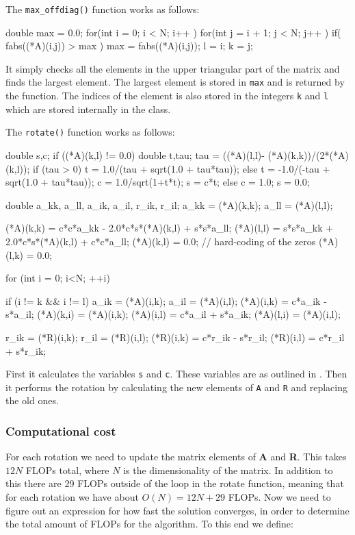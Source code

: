 \documentclass[reprint,english,notitlepage]{revtex4-1}  %
\begin{document}
The \verb+max_offdiag()+ function works as follows:

\begin{cpp}
double max = 0.0;
for(int i = 0; i < N; i++ ){
  for(int j = i + 1; j < N; j++ ){
    if( fabs((*A)(i,j)) > max ){
      max = fabs((*A)(i,j));
      l = i;
      k = j;
    }
  }
}
\end{cpp}

It simply checks all the elements in the upper triangular part of the matrix and finds the largest element. The largest element is stored in \verb+max+ and is returned by the function. The indices of the element is also stored in the integers \verb+k+ and \verb+l+ which are stored internally in the class.

The \verb+rotate()+ function works as follows:

\begin{cpp}
double s,c;
if ((*A)(k,l) != 0.0){
  double t,tau;
  tau = ((*A)(l,l)- (*A)(k,k))/(2*(*A)(k,l));
  if (tau > 0){
    t = 1.0/(tau + sqrt(1.0 + tau*tau));
  }
  else {
    t = -1.0/(-tau + sqrt(1.0 + tau*tau));
  }
  c = 1.0/sqrt(1+t*t);
  s = c*t;
}
else {
  c = 1.0;
  s = 0.0;
}

double a_kk, a_ll, a_ik, a_il, r_ik, r_il;
a_kk = (*A)(k,k);
a_ll = (*A)(l,l);

(*A)(k,k) = c*c*a_kk - 2.0*c*s*(*A)(k,l) + s*s*a_ll;
(*A)(l,l) = s*s*a_kk + 2.0*c*s*(*A)(k,l) + c*c*a_ll;
(*A)(k,l) = 0.0; // hard-coding of the zeros
(*A)(l,k) = 0.0;

for (int i = 0; i<N; ++i){
  if (i != k && i != l) {
    a_ik = (*A)(i,k);
    a_il = (*A)(i,l);
    (*A)(i,k) = c*a_ik - s*a_il;
    (*A)(k,i) = (*A)(i,k);
    (*A)(i,l) = c*a_il + s*a_ik;
    (*A)(l,i) = (*A)(i,l);
  }

  r_ik = (*R)(i,k);
  r_il = (*R)(i,l);
  (*R)(i,k) = c*r_ik - s*r_il;
  (*R)(i,l) = c*r_il + s*r_ik;
}
\end{cpp}

First it calculates the variables \verb+s+ and \verb+c+. These variables are as outlined in \citep{Hjorth-Jensen2015}. Then it performs the rotation by calculating the new elements of \verb+A+ and \verb+R+ and replacing the old ones.

\subsubsection{Computational cost} \label{sec:III:a:i}

For each rotation we need to update the matrix elements of \textbf{A} and \textbf{R}. This takes $12N$ FLOPs total, where $N$ is the dimensionality of the matrix. In addition to this there are 29 FLOPs outside of the loop in the rotate function, meaning that for each rotation we have about $O(N) = 12N + 29$ FLOPs. Now we need to figure out an expression for how fast the solution converges, in order to determine the total amount of FLOPs for the algorithm. To this end we define:
\end{document}
